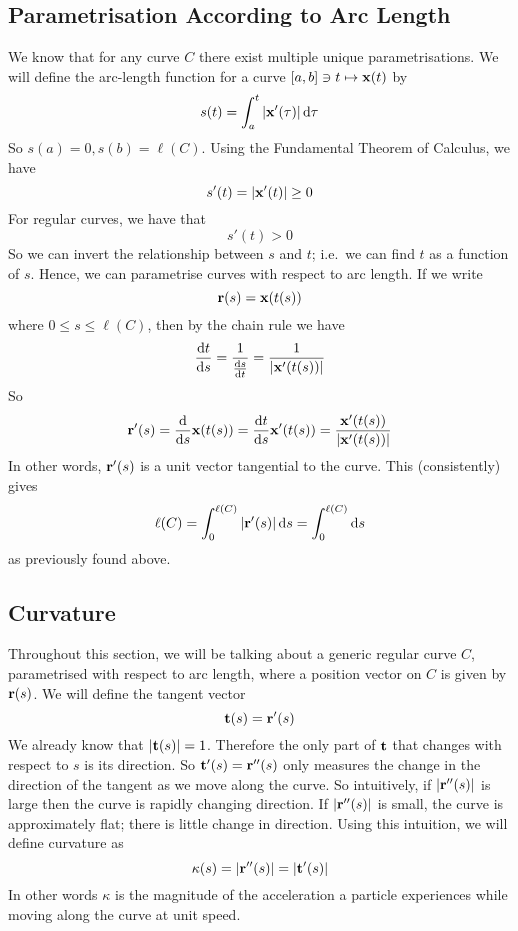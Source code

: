 \subsection{Parametrisation According to Arc Length}
We know that for any curve \(C\) there exist multiple unique parametrisations.
We will define the arc-length function for a curve \([a, b] \ni t \mapsto \vb x(t)\) by
\[
	s(t) = \int_a^t \abs{\vb x'(\tau)} \,\dd \tau
\]
So \(s(a) = 0, s(b) = \ell(C)\).
Using the Fundamental Theorem of Calculus, we have
\[
	s'(t) = \abs{\vb x'(t)} \geq 0
\]
For regular curves, we have that
\[
	s'(t) > 0
\]
So we can invert the relationship between \(s\) and \(t\); i.e.\ we can find \(t\) as a function of \(s\).
Hence, we can parametrise curves with respect to arc length.
If we write
\[
	\vb r(s) = \vb x(t(s))
\]
where \(0 \leq s \leq \ell(C)\), then by the chain rule we have
\[
	\frac{\dd{t}}{\dd{s}} = \frac{1}{\frac{\dd{s}}{\dd{t}}} = \frac{1}{\abs{\vb x'(t(s))}}
\]
So
\[
	\vb r'(s) = \frac{\dd}{\dd{s}} \vb x(t(s)) = \frac{\dd{t}}{\dd{s}} \vb x'(t(s)) = \frac{\vb x'(t(s))}{\abs{\vb x'(t(s))}}
\]
In other words, \(\vb r'(s)\) is a unit vector tangential to the curve.
This (consistently) gives
\[
	\ell(C) = \int_0^{\ell(C)} \abs{\vb r'(s)} \dd{s} = \int_0^{\ell(C)} \dd{s}
\]
as previously found above.

\subsection{Curvature}
Throughout this section, we will be talking about a generic regular curve \(C\), parametrised with respect to arc length, where a position vector on \(C\) is given by \(\vb r(s)\).
We will define the tangent vector
\[
	\vb t(s) = \vb r'(s)
\]
We already know that \(\abs{\vb t(s)} = 1\).
Therefore the only part of \(\vb t\) that changes with respect to \(s\) is its direction.
So \(\vb t'(s) = \vb r''(s)\) only measures the change in the direction of the tangent as we move along the curve.
So intuitively, if \(\abs{\vb r''(s)}\) is large then the curve is rapidly changing direction.
If \(\abs{\vb r''(s)}\) is small, the curve is approximately flat; there is little change in direction.
Using this intuition, we will define curvature as
\[
	\kappa(s) = \abs{\vb r''(s)} = \abs{\vb t'(s)}
\]
In other words \(\kappa\) is the magnitude of the acceleration a particle experiences while moving along the curve at unit speed.

